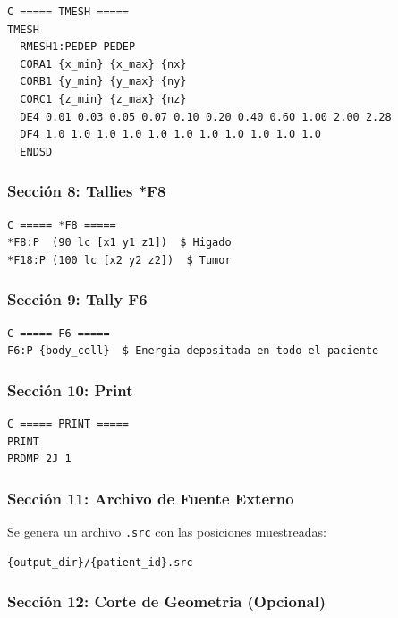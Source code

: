 \documentclass[12pt,a4paper]{article}
\begin{document}
\begin{lstlisting}
C ===== TMESH =====
TMESH
  RMESH1:PEDEP PEDEP
  CORA1 {x_min} {x_max} {nx}
  CORB1 {y_min} {y_max} {ny}
  CORC1 {z_min} {z_max} {nz}
  DE4 0.01 0.03 0.05 0.07 0.10 0.20 0.40 0.60 1.00 2.00 2.28
  DF4 1.0 1.0 1.0 1.0 1.0 1.0 1.0 1.0 1.0 1.0 1.0
  ENDSD
\end{lstlisting}

\subsubsection{Sección 8: Tallies *F8}

\begin{lstlisting}
C ===== *F8 =====
*F8:P  (90 lc [x1 y1 z1])  $ Higado
*F18:P (100 lc [x2 y2 z2])  $ Tumor
\end{lstlisting}

\subsubsection{Sección 9: Tally F6}

\begin{lstlisting}
C ===== F6 =====
F6:P {body_cell}  $ Energia depositada en todo el paciente
\end{lstlisting}

\subsubsection{Sección 10: Print}

\begin{lstlisting}
C ===== PRINT =====
PRINT
PRDMP 2J 1
\end{lstlisting}

\subsubsection{Sección 11: Archivo de Fuente Externo}

Se genera un archivo \texttt{.src} con las posiciones muestreadas:

\begin{lstlisting}
{output_dir}/{patient_id}.src
\end{lstlisting}

\subsubsection{Sección 12: Corte de Geometria (Opcional)}
\end{document}
